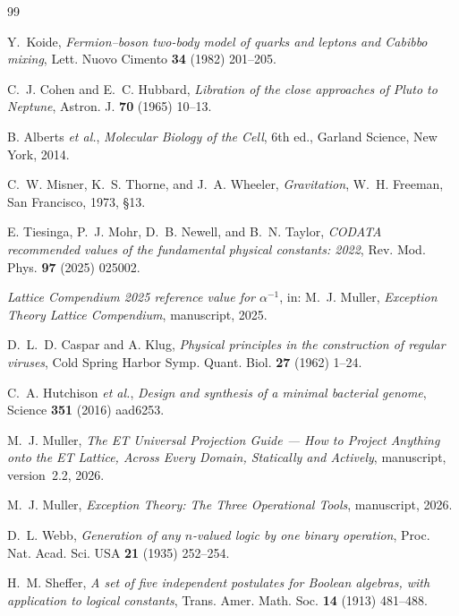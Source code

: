 \documentclass[11pt,a4paper]{article}
\theoremstyle{definition}
\theoremstyle{remark}
\begin{document}
\begin{thebibliography}{99}

Y.~Koide,
\emph{Fermion--boson two-body model of quarks and leptons and Cabibbo mixing},
Lett. Nuovo Cimento {\bf 34} (1982) 201--205.

C.~J. Cohen and E.~C. Hubbard,
\emph{Libration of the close approaches of Pluto to Neptune},
Astron. J. {\bf 70} (1965) 10--13.

B. Alberts \emph{et al.},
\emph{Molecular Biology of the Cell}, 6th ed., Garland Science, New York, 2014.

C.~W. Misner, K.~S. Thorne, and J.~A. Wheeler,
\emph{Gravitation}, W.~H. Freeman, San Francisco, 1973, \S 13.

E. Tiesinga, P.~J. Mohr, D.~B. Newell, and B.~N. Taylor,
\emph{CODATA recommended values of the fundamental physical constants: 2022},
Rev. Mod. Phys. {\bf 97} (2025) 025002.

\emph{Lattice Compendium 2025 reference value for $\alpha^{-1}$}, in: M.~J. Muller, \emph{Exception Theory Lattice Compendium}, manuscript, 2025.

D.~L.~D. Caspar and A. Klug,
\emph{Physical principles in the construction of regular viruses},
Cold Spring Harbor Symp. Quant. Biol. {\bf 27} (1962) 1--24.

C.~A. Hutchison \emph{et al.},
\emph{Design and synthesis of a minimal bacterial genome},
Science {\bf 351} (2016) aad6253.

M.~J. Muller,
\emph{The ET Universal Projection Guide --- How to Project Anything onto the ET Lattice, Across Every Domain, Statically and Actively}, manuscript, version~2.2, 2026.

M.~J. Muller,
\emph{Exception Theory: The Three Operational Tools}, manuscript, 2026.

D.~L. Webb,
\emph{Generation of any $n$-valued logic by one binary operation},
Proc. Nat. Acad. Sci. USA {\bf 21} (1935) 252--254.

H.~M. Sheffer,
\emph{A set of five independent postulates for Boolean algebras, with application to logical constants},
Trans. Amer. Math. Soc. {\bf 14} (1913) 481--488.


\end{thebibliography}
\end{document}
